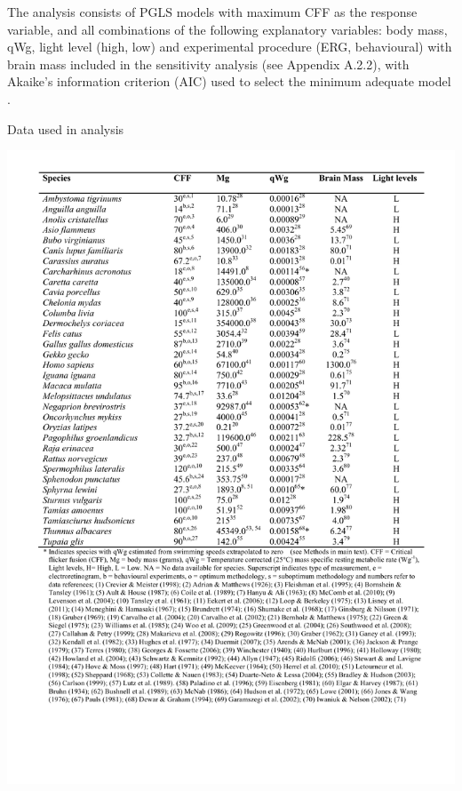 The analysis consists of PGLS models with maximum CFF as the response variable, and all combinations of the following explanatory variables: body mass, qWg, light level (high, low) and experimental procedure (ERG, behavioural) with brain mass included in the sensitivity analysis (see Appendix A.2.2), with Akaike's information criterion (AIC) used to select the minimum adequate model \citep{burnham2002model}.

\newpage

\begin{table}[p!]
  \caption[Table 1.]{Data used in analysis}
  \label{tbl:Table 1.}
  \includegraphics[width=\linewidth]{ch2-time/Table_1}
\end{table}

\newpage

